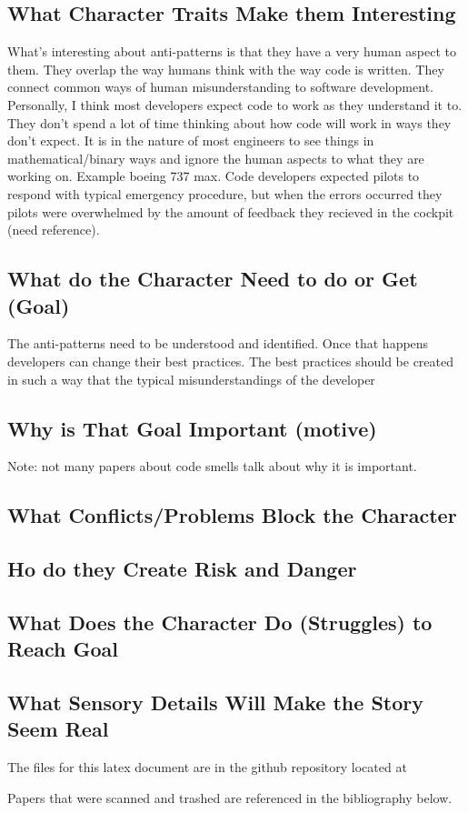 \documentclass[conference]{IEEEtran}
\begin{document}
\subsection{What Character Traits Make them Interesting}
What's interesting about anti-patterns is that they have a very human aspect to them. 
They overlap the way humans think with the way code is written. 
They connect common ways of human misunderstanding to software development. 
Personally, I think most developers expect code to work as they understand it to. 
They don't spend a lot of time thinking about how code will work in ways they don't expect.
It is in the nature of most engineers to see things in mathematical/binary ways and ignore the human aspects to what they are working on.
Example boeing 737 max.
Code developers expected pilots to respond with typical emergency procedure, but when the errors occurred they pilots were overwhelmed by the amount of feedback they recieved in the cockpit (need reference).

\subsection{What do the Character Need to do or Get (Goal)}
The anti-patterns need to be understood and identified.
Once that happens developers can change their best practices.
The best practices should be created in such a way that the typical misunderstandings of the developer

\subsection{Why is That Goal Important (motive)}
Note: not many papers about code smells talk about why it is important.

\subsection{What Conflicts/Problems Block the Character}
\subsection{Ho do they Create Risk and Danger}
\subsection{What Does the Character Do (Struggles) to Reach Goal}
\subsection{What Sensory Details Will Make the Story Seem Real}

The files for this latex document are in the github repository located at 

Papers that were scanned and trashed are referenced in the bibliography below. 
\nocite{*}
\clearpage




\end{document}

